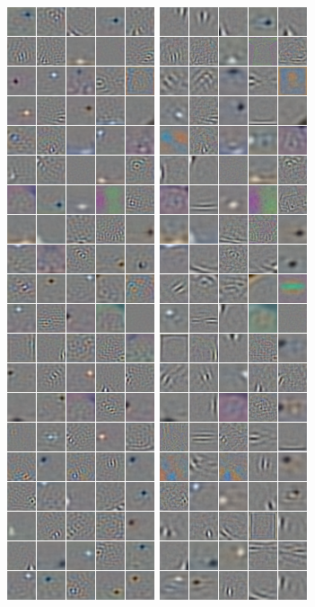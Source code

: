 \documentclass[paperwidth=38in,paperheight=28in,landscape,fontscale=0.4]{baposter}
\begin{document}
\begin{poster}
{\begin{center}
\includegraphics[scale=0.366]{sat_linear1.png}	
\includegraphics[scale=0.366]{sat_linear2.png}	
\end{center} 
}


\end{poster}
\end{document}
